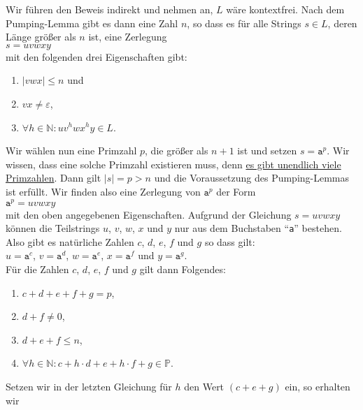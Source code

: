\solution
Wir f\"uhren den Beweis indirekt und nehmen an, $L$ w\"are kontextfrei.  Nach
dem Pumping-Lemma gibt es dann eine Zahl $n$, so dass es f\"ur alle Strings $s \in L$, 
deren L\"ange gr\"o{\ss}er als $n$ ist, eine Zerlegung
\\[0.2cm]
\hspace*{1.3cm}
$s = uvwxy$
\\[0.2cm]
mit den folgenden drei Eigenschaften gibt:
\begin{enumerate}
\item $|vwx| \leq n$ \quad und
\item $vx \not= \varepsilon$, 
\item $\forall h \in \mathbb{N}: u v^h w x^h y \in L$.
\end{enumerate}
Wir w\"ahlen nun eine Primzahl $p$, die gr\"o{\ss}er als $n+1$ ist und setzen $s = \mathtt{a}^p$.
Wir wissen, dass eine solche Primzahl existieren muss, denn 
\href{http://en.wikipedia.org/wiki/Prime_number#Number_of_prime_numbers}{es gibt unendlich viele Primzahlen}. 
Dann gilt $|s| = p > n$ und die Voraussetzung des Pumping-Lemmas ist erf\"ullt.
Wir finden also eine Zerlegung von $\mathtt{a}^p$ der Form
\\[0.2cm]
\hspace*{1.3cm}
$\mathtt{a}^p = uvwxy$ 
\\[0.2cm]
mit den oben angegebenen Eigenschaften.
Aufgrund der Gleichung $s = uvwxy$ k\"onnen die Teilstrings $u$, $v$, $w$, $x$ und $y$ nur aus dem
Buchstaben ``\texttt{a}'' bestehen.  Also gibt es nat\"urliche Zahlen $c$, $d$, $e$, $f$ und
$g$ so dass gilt:
\\[0.2cm]
\hspace*{1.3cm}
$u = \mathtt{a}^c$, \quad $v = \mathtt{a}^d$, \quad $w = \mathtt{a}^e$, \quad 
$x = \mathtt{a}^f$ \quad und \quad $y = \mathtt{a}^g$.
\\[0.2cm]
F\"ur die Zahlen $c$, $d$, $e$, $f$ und $g$ gilt dann Folgendes:
\begin{enumerate}
\item $c + d + e + f + g = p$,
\item $d + f \not= 0$,
\item $d + e + f \leq n$,
\item $\forall h \in \mathbb{N}: c + h \cdot d + e + h \cdot f + g \in \mathbb{P}$.
\end{enumerate}
Setzen wir in der letzten Gleichung f\"ur $h$ den Wert $(c + e + g)$ ein, so erhalten wir
\\[0.2cm]
\hspace*{1.3cm}
